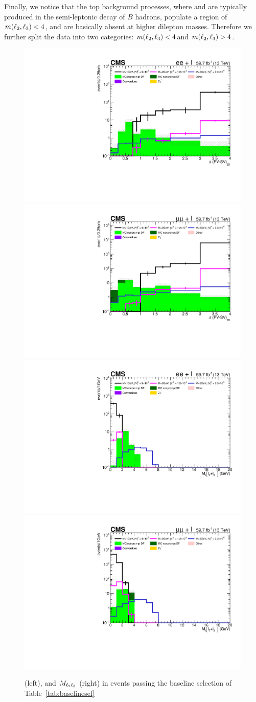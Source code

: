 Finally, we notice that the top background processes, where \ltwo and
\lthree are typically produced in the semi-leptonic decay of $B$
hadrons, populate a region of $m(\ell_2,\ell_3)<4$\GeV, and are basically absent
at higher dilepton masses. Therefore we further split the data into
two categories: $m(\ell_2,\ell_3)<4$\GeV and $m(\ell_2,\ell_3)>4$\GeV.\\
 
 \begin{figure}
  \centering
  \includegraphics[clip,trim=0.9cm 0.7cm 0.7cm 0.9cm,width=.3\textwidth]{Figures/c6/selection/18/e_DeltaPV_SV_2D_zomm__final.pdf}
  \includegraphics[clip,trim=0.9cm 0.7cm 0.7cm 0.9cm,width=.3\textwidth]{Figures/c6/selection/18/mu_DeltaPV_SV_2D_zomm__final.pdf}\\
  \includegraphics[clip,trim=0.9cm 0.7cm 0.7cm 0.9cm,width=.3\textwidth]{Figures/c6/selection/18/e_M_ll_l2_l3_zoom__final.pdf}
  \includegraphics[clip,trim=0.9cm 0.7cm 0.7cm 0.9cm,width=.3\textwidth]{Figures/c6/selection/18/mu_M_ll_l2_l3_zoom__final.pdf}
  \caption{\Deltwod (left), and $M_{\ell_2 \ell_3}$ (right) in events
    passing the baseline selection of Table~\ref{tab:baselinesel}}
  \label{fig:reco_displ}
\end{figure}

